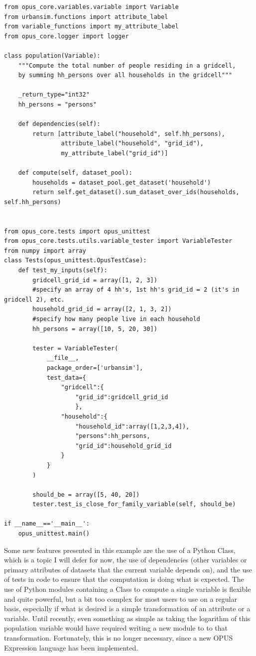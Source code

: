 \begin{lstlisting}
from opus_core.variables.variable import Variable
from urbansim.functions import attribute_label
from variable_functions import my_attribute_label
from opus_core.logger import logger

class population(Variable):
    """Compute the total number of people residing in a gridcell, 
    by summing hh_persons over all households in the gridcell"""
    
    _return_type="int32"
    hh_persons = "persons"

    def dependencies(self):
        return [attribute_label("household", self.hh_persons), 
                attribute_label("household", "grid_id"), 
                my_attribute_label("grid_id")]

    def compute(self, dataset_pool):
        households = dataset_pool.get_dataset('household')
        return self.get_dataset().sum_dataset_over_ids(households, self.hh_persons)


from opus_core.tests import opus_unittest
from opus_core.tests.utils.variable_tester import VariableTester
from numpy import array
class Tests(opus_unittest.OpusTestCase):
    def test_my_inputs(self):
        gridcell_grid_id = array([1, 2, 3])
        #specify an array of 4 hh's, 1st hh's grid_id = 2 (it's in gridcell 2), etc.
        household_grid_id = array([2, 1, 3, 2]) 
        #specify how many people live in each household
        hh_persons = array([10, 5, 20, 30])

        tester = VariableTester(
            __file__,
            package_order=['urbansim'],
            test_data={
                "gridcell":{
                    "grid_id":gridcell_grid_id 
                    }, 
                "household":{ 
                    "household_id":array([1,2,3,4]),
                    "persons":hh_persons, 
                    "grid_id":household_grid_id
                }
            }
        )
        
        should_be = array([5, 40, 20])
        tester.test_is_close_for_family_variable(self, should_be)

if __name__=='__main__':
    opus_unittest.main()
\end{lstlisting}

Some new features presented in this example are the use of a Python Class, which is a topic I will defer for now, the use of dependencies (other variables or primary attributes of datasets that the current variable depends on), and the use of tests in code to ensure that the computation is doing what is expected.  The use of Python modules containing a Class to compute a single variable is flexible and quite powerful, but a bit too complex for most users to use on a regular basis, especially if what is desired is a simple transformation of an attribute or a variable.  Until recently, even something as simple as taking the logarithm of this population variable would have required writing a new module to to that transformation.  Fortunately, this is no longer necessary, since a new OPUS Expression language has been implemented.

